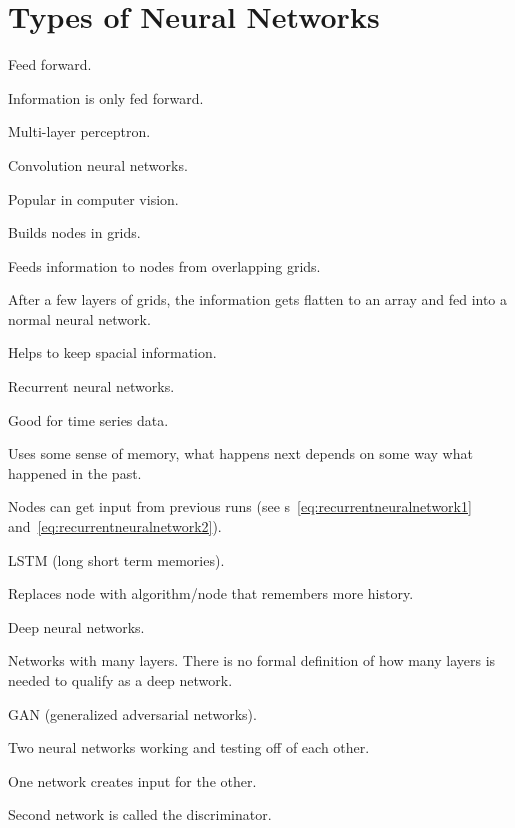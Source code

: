 	\section{Types of Neural Networks}
	\begin{bulletedlist}
		\item Feed forward.
		\begin{bulletedlist}
			\item Information is only fed forward.
			\item Multi-layer perceptron.
			\item Convolution neural networks.
			\begin{bulletedlist}
				\item Popular in computer vision.
				\item Builds nodes in grids.
				\item Feeds information to nodes from overlapping grids.
				\item After a few layers of grids, the information gets flatten to an array and fed into a normal neural network.
				\item Helps to keep spacial information.
			\end{bulletedlist}
		\end{bulletedlist}
		\item Recurrent neural networks.
		\begin{bulletedlist}
			\item Good for time series data.
			\item Uses some sense of memory, what happens next depends on some way what happened in the past.
			\item Nodes can get input from previous runs (see \equationname{}s~\ref{eq:recurrentneuralnetwork1} and~\ref{eq:recurrentneuralnetwork2}).
			\item
			\item LSTM (long short term memories).
			\begin{bulletedlist}
				\item Replaces node with algorithm/node that remembers more history.
			\end{bulletedlist}
		\end{bulletedlist}
		\item Deep neural networks.
		\begin{bulletedlist}
			\item Networks with many layers.  There is no formal definition of how many layers is needed to qualify as a deep network.
		\end{bulletedlist}
		\item GAN (generalized adversarial networks).
		\begin{bulletedlist}
			\item Two neural networks working and testing off of each other.
			\item One network creates input for the other.
			\item Second network is called the discriminator.
		\end{bulletedlist}
	\end{bulletedlist}

